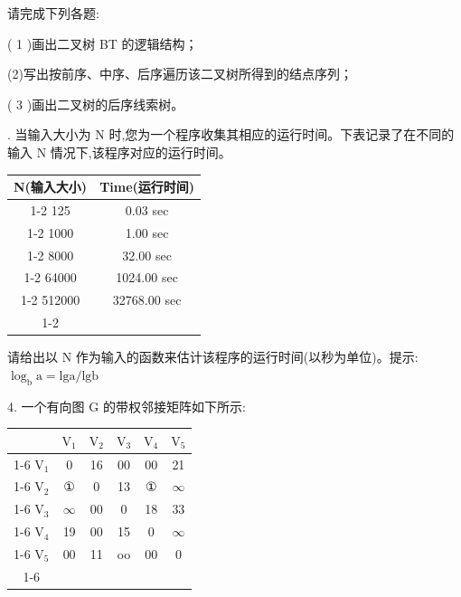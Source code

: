 请完成下列各题:

( 1 )画出二叉树 BT 的逻辑结构；

(2)写出按前序、中序、后序遍历该二叉树所得到的结点序列；

( 3 )画出二叉树的后序线索树。
\vspace{14em}

. 当输入大小为 \(\mathrm{N}\) 时,您为一个程序收集其相应的运行时间。下表记录了在不同的输入 \(\mathrm{N}\) 情况下,该程序对应的运行时间。

\begin{center}
\begin{tabular}{|c|c|}
\hline
N(输入大小) & Time(运行时间) \\
\cline{1-2}
125 & 0.03 sec \\
\cline{1-2}
1000 & 1.00 sec \\
\cline{1-2}
8000 & 32.00 sec \\
\cline{1-2}
64000 & 1024.00 sec \\
\cline{1-2}
512000 & 32768.00 sec \\
\cline{1-2}
\hline
\end{tabular}
\end{center}

请给出以 \(\mathrm{N}\) 作为输入的函数来估计该程序的运行时间(以秒为单位)。提示: \({\log }_{\mathrm{b}}\mathrm{a} = \mathrm{{lg}}\mathrm{a}/\mathrm{{lg}}\mathrm{b}\)
\vspace{15em}

4. 一个有向图 \(\mathrm{G}\) 的带权邻接矩阵如下所示:

\begin{center}
\begin{tabular}{|c|c|c|c|c|c|}
\hline
\phantom{X} & \({\mathrm{V}}_{1}\) & \({\mathrm{V}}_{2}\) & \({\mathrm{V}}_{3}\) & \({\mathrm{V}}_{4}\) & \({\mathrm{V}}_{5}\) \\
\cline{1-6}
\({\mathrm{V}}_{1}\) & 0 & 16 & 00 & 00 & 21 \\
\cline{1-6}
\({\mathrm{V}}_{2}\) & ① & 0 & 13 & ① & \(\infty\) \\
\cline{1-6}
\({\mathrm{V}}_{3}\) & \(\infty\) & 00 & 0 & 18 & 33 \\
\cline{1-6}
\({\mathrm{V}}_{4}\) & 19 & 00 & 15 & 0 & \(\infty\) \\
\cline{1-6}
\({\mathrm{V}}_{5}\) & 00 & 11 & oo & 00 & 0 \\
\cline{1-6}
\hline
\end{tabular}
\end{center}


